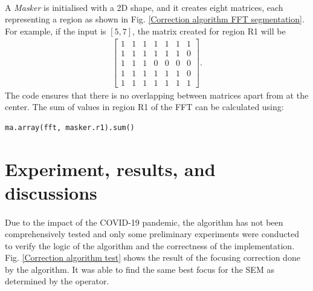 \documentclass[12pt, twocolumn]{report}
\begin{document}
\paragraph{}
A \textit{Masker} is initialised with a 2D shape, and it creates eight matrices, each representing a region as shown in Fig. \ref{Correction algorithm FFT segmentation}. For example, if the input is $[5, 7]$, the matrix created for region R1 will be
\begin{align*}
\begin{bmatrix}
1 & 1 & 1 & 1 & 1 & 1 & 1\\
1 & 1 & 1 & 1 & 1 & 1 & 0\\
1 & 1 & 1 & 0 & 0 & 0 & 0\\
1 & 1 & 1 & 1 & 1 & 1 & 0\\
1 & 1 & 1 & 1 & 1 & 1 & 1
\end{bmatrix}.
\end{align*}
The code ensures that there is no overlapping between matrices apart from at the center. The sum of values in region R1 of the FFT can be calculated using:
\begin{lstlisting}
ma.array(fft, masker.r1).sum()
\end{lstlisting}

\section{Experiment, results, and discussions}
\paragraph{}
Due to the impact of the COVID-19 pandemic, the algorithm has not been comprehensively tested and only some preliminary experiments were conducted to verify the logic of the algorithm and the correctness of the implementation. Fig. \ref{Correction algorithm test} shows the result of the focusing correction done by the algorithm. It was able to find the same best focus for the SEM as determined by the operator.
\end{document}
